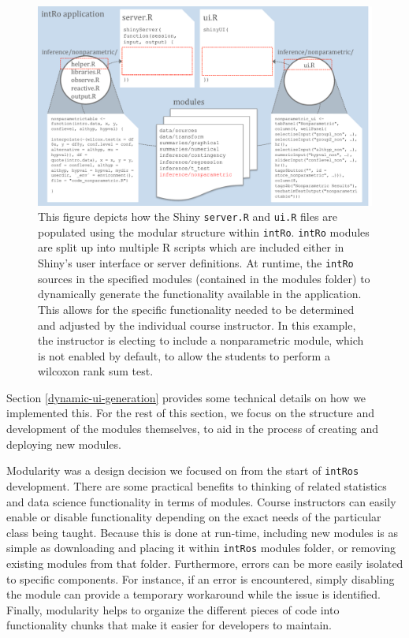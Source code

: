 \documentclass[12pt,]{article}
\begin{document}
\begin{figure}[ht!]
\centering
\includegraphics[width=\linewidth]{app_creation_modules.pdf}
\caption{This figure depicts how the Shiny \texttt{server.R} and \texttt{ui.R} files are populated using the modular structure within \texttt{intRo}. \texttt{intRo} modules are split up into multiple R scripts which are included either in Shiny's user interface or server definitions. At runtime, the \texttt{intRo} sources in the specified modules (contained in the modules folder) to dynamically generate the functionality available in the application. This allows for the specific functionality needed to be determined and adjusted by the individual course instructor. In this example, the instructor is electing to include a nonparametric module, which is not enabled by default, to allow the students to perform a wilcoxon rank sum test.}
\label{fig:app_creation_modules}
\end{figure}

Section \ref{dynamic-ui-generation} provides some technical details on
how we implemented this. For the rest of this section, we focus on the
structure and development of the modules themselves, to aid in the
process of creating and deploying new modules.

Modularity was a design decision we focused on from the start of
\texttt{intRo\textquotesingle{}s} development. There are some practical
benefits to thinking of related statistics and data science
functionality in terms of modules. Course instructors can easily enable
or disable functionality depending on the exact needs of the particular
class being taught. Because this is done at run-time, including new
modules is as simple as downloading and placing it within
\texttt{intRo\textquotesingle{}s} modules folder, or removing existing
modules from that folder. Furthermore, errors can be more easily
isolated to specific components. For instance, if an error is
encountered, simply disabling the module can provide a temporary
workaround while the issue is identified. Finally, modularity helps to
organize the different pieces of code into functionality chunks that
make it easier for developers to maintain.
\end{document}

